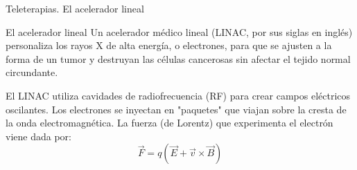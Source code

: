\documentclass{beamer}
\begin{document}
\begin{frame}{Teleterapias. El acelerador lineal}
\begin{block}{El acelerador lineal}
Un acelerador médico lineal (LINAC, por sus siglas en inglés) personaliza los rayos X de alta energía, o electrones, para que se ajusten a la forma de un tumor y destruyan las células cancerosas sin afectar el tejido normal circundante.
\end{block}
El LINAC utiliza cavidades de radiofrecuencia (RF) para crear campos eléctricos oscilantes. Los electrones se inyectan en "paquetes" que viajan sobre la cresta de la onda electromagnética.
La fuerza (de Lorentz) que experimenta el electrón viene dada por: 
\begin{equation}
    \vec{F}=q(\vec{E}+\vec{v}\times \vec{B})
\end{equation}
\end{frame}
\end{document}
